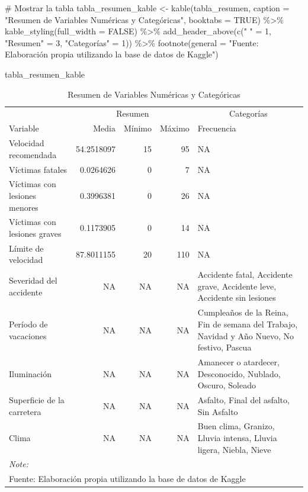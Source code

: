 \documentclass[
  letterpaper,
  DIV=11,
  numbers=noendperiod]{scrartcl}
\newenvironment{Shaded}{\begin{snugshade}}{\end{snugshade}}
\newcommand{\AttributeTok}[1]{\textcolor[rgb]{0.40,0.45,0.13}{#1}}
\newcommand{\CommentTok}[1]{\textcolor[rgb]{0.37,0.37,0.37}{#1}}
\newcommand{\ConstantTok}[1]{\textcolor[rgb]{0.56,0.35,0.01}{#1}}
\newcommand{\DecValTok}[1]{\textcolor[rgb]{0.68,0.00,0.00}{#1}}
\newcommand{\FunctionTok}[1]{\textcolor[rgb]{0.28,0.35,0.67}{#1}}
\newcommand{\NormalTok}[1]{\textcolor[rgb]{0.00,0.23,0.31}{#1}}
\newcommand{\OtherTok}[1]{\textcolor[rgb]{0.00,0.23,0.31}{#1}}
\newcommand{\SpecialCharTok}[1]{\textcolor[rgb]{0.37,0.37,0.37}{#1}}
\newcommand{\StringTok}[1]{\textcolor[rgb]{0.13,0.47,0.30}{#1}}
\begin{document}
\begin{Shaded}
\begin{Highlighting}[]
\CommentTok{\# Mostrar la tabla}
\NormalTok{tabla\_resumen\_kable }\OtherTok{\textless{}{-}} \FunctionTok{kable}\NormalTok{(tabla\_resumen, }\AttributeTok{caption =} \StringTok{"Resumen de Variables Numéricas y Categóricas"}\NormalTok{, }\AttributeTok{booktabs =} \ConstantTok{TRUE}\NormalTok{) }\SpecialCharTok{\%\textgreater{}\%}
  \FunctionTok{kable\_styling}\NormalTok{(}\AttributeTok{full\_width =} \ConstantTok{FALSE}\NormalTok{) }\SpecialCharTok{\%\textgreater{}\%}
  \FunctionTok{add\_header\_above}\NormalTok{(}\FunctionTok{c}\NormalTok{(}\StringTok{" "} \OtherTok{=} \DecValTok{1}\NormalTok{, }\StringTok{"Resumen"} \OtherTok{=} \DecValTok{3}\NormalTok{, }\StringTok{"Categorías"} \OtherTok{=} \DecValTok{1}\NormalTok{)) }\SpecialCharTok{\%\textgreater{}\%}
  \FunctionTok{footnote}\NormalTok{(}\AttributeTok{general =} \StringTok{"Fuente: Elaboración propia utilizando la base de datos de Kaggle"}\NormalTok{)}

\NormalTok{tabla\_resumen\_kable}
\end{Highlighting}
\end{Shaded}

\begin{longtable}[t]{lrrrl}
\caption{Resumen de Variables Numéricas y Categóricas}\\
\toprule
\multicolumn{1}{c}{ } & \multicolumn{3}{c}{Resumen} & \multicolumn{1}{c}{Categorías} \\
\cmidrule(l{3pt}r{3pt}){2-4} \cmidrule(l{3pt}r{3pt}){5-5}
Variable & Media & Mínimo & Máximo & Frecuencia\\
\midrule
Velocidad recomendada & 54.2518097 & 15 & 95 & NA\\
Víctimas fatales & 0.0264626 & 0 & 7 & NA\\
Víctimas con lesiones menores & 0.3996381 & 0 & 26 & NA\\
Víctimas con lesiones graves & 0.1173905 & 0 & 14 & NA\\
Límite de velocidad & 87.8011155 & 20 & 110 & NA\\
\addlinespace
Severidad del accidente & NA & NA & NA & Accidente fatal, Accidente grave, Accidente leve, Accidente sin lesiones\\
Período de vacaciones & NA & NA & NA & Cumpleaños de la Reina, Fin de semana del Trabajo, Navidad y Año Nuevo, No festivo, Pascua\\
Iluminación & NA & NA & NA & Amanecer o atardecer, Desconocido, Nublado, Oscuro, Soleado\\
Superficie de la carretera & NA & NA & NA & Asfalto, Final del asfalto, Sin Asfalto\\
Clima & NA & NA & NA & Buen clima, Granizo, Lluvia intensa, Lluvia ligera, Niebla, Nieve\\
\bottomrule
\multicolumn{5}{l}{\rule{0pt}{1em}\textit{Note: }}\\
\multicolumn{5}{l}{\rule{0pt}{1em}Fuente: Elaboración propia utilizando la base de datos de Kaggle}\\
\end{longtable}
\end{document}
